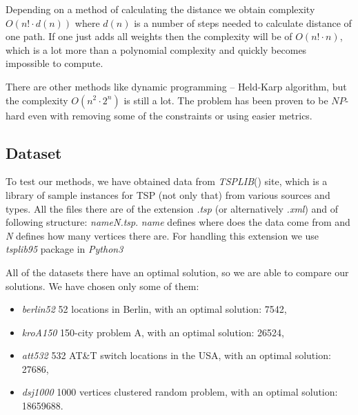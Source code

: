 	Depending on a method of calculating the distance we obtain complexity $O(n! \cdot d(n))$ where $d(n)$ is a number of steps needed to calculate distance of one path. If one just adds all weights then the complexity will be of $O(n! \cdot n)$, which is a lot more than a polynomial complexity and quickly becomes impossible to compute.
	
	There are other methods like dynamic programming -- Held-Karp algorithm, but the complexity $O(n^2 \cdot 2^n)$ is still a lot. The problem has been proven to be $NP$-hard even with removing some of the constraints or using easier metrics.

\subsection{Dataset}
	To test our methods, we have obtained data from \textit{TSPLIB}(\cite{TSPLIB8:online}) site, which is a library of sample instances for TSP (not only that) from various sources and types. All the files there are of the extension \textit{.tsp} (or alternatively \textit{.xml}) and of following structure: \textit{nameN.tsp}. \textit{name} defines where does the data come from and \textit{N} defines how many vertices there are. For handling this extension we use \textit{tsplib95} package in \textit{Python3}
	
	All of the datasets there have an optimal solution, so we are able to compare our solutions. We have chosen only some of them:
	\begin{itemize}
		\item \textit{berlin52} 52 locations in Berlin, with an optimal solution: 7542,
		\item \textit{kroA150} 150-city problem A, with an optimal solution: 26524,
		\item \textit{att532} 532 AT\&T switch locations in the USA, with an optimal solution: 27686,
		\item \textit{dsj1000} 1000 vertices clustered random problem, with an optimal solution: 18659688.
	\end{itemize}